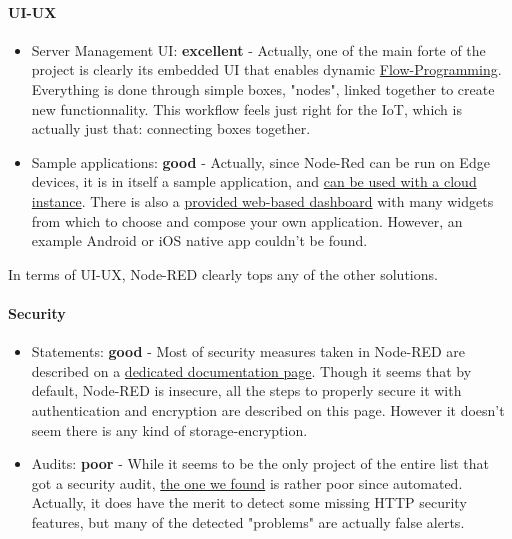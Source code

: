 \documentclass{article}
\begin{document}
\paragraph{UI-UX}

\begin{itemize}
\item Server Management UI: \textbf{excellent} - Actually, one of the main forte of the project is clearly its embedded UI that enables dynamic \href{https://en.wikipedia.org/wiki/Flow-based_programming}{Flow-Programming}. Everything is done through simple boxes, "nodes", linked together to create new functionnality. This workflow feels just right for the IoT, which is actually just that: connecting boxes together.
\item Sample applications: \textbf{good} - Actually, since Node-Red can be run on Edge devices, it is in itself a sample application, and \href{http://developers.sensetecnic.com/article/tutorial-connecting-device-node-red-to-cloud-node-red/}{can be used with a cloud instance}. There is also a \href{https://github.com/node-red/node-red-dashboard}{provided web-based dashboard} with many widgets from which to choose and compose your own application. However, an example Android or iOS native app couldn't be found.
\end{itemize}

In terms of UI-UX, Node-RED clearly tops any of the other solutions.

\paragraph{Security}

\begin{itemize}
\item Statements: \textbf{good} - Most of security measures taken  in Node-RED are described on a \href{https://nodered.org/docs/security}{dedicated documentation page}. Though it seems that by default, Node-RED is insecure, all the steps to properly secure it with authentication and encryption are described on this page. However it doesn't seem there is any kind of storage-encryption.
\item Audits: \textbf{poor} - While it seems to be the only project of the entire list that got a security audit, \href{http://www.isgroup.it/node.security/audit-node-red.html}{the one we found} is rather poor since automated. Actually, it does have the merit to detect some missing HTTP security features, but many of the detected "problems" are actually false alerts.
\end{itemize}
\end{document}
